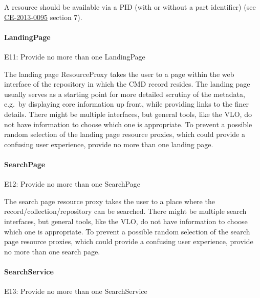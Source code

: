 A resource should be available via a PID (with or without a part identifier) (see
\href{http://hdl.handle.net/1839/00-DOCS.CLARIN.EU-78}{CE-2013-0095} section 7).

\paragraph{LandingPage}\label{landingpage}

\label{e11}
E11: Provide no more than one LandingPage


The landing page ResourceProxy takes the user to a page within the web interface of the repository in which the CMD record resides. The landing page usually serves as a starting point for more detailed scrutiny of the metadata, e.g.~by displaying core information up front, while providing links to the finer details. There might be multiple interfaces, but general tools, like the VLO, do not have information to choose which one is appropriate. To prevent a possible random selection
of the landing page resource proxies, which could provide a confusing user experience, provide no more than one landing page.

\paragraph{SearchPage}\label{searchpage}

E12: Provide no more than one SearchPage

 

The search page resource proxy takes the user to a place where the record/collection/repository can be searched. There might be multiple search interfaces, but general tools, like the VLO, do not have information to choose which one is appropriate. To prevent a possible random selection of the search page resource proxies, which could provide a confusing user experience, provide no more than one search page.

\paragraph{SearchService}\label{searchservice}

E13: Provide no more than one SearchService

 

